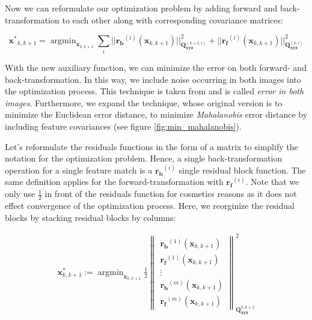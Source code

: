 \documentclass[a4paper]{report}
\numberwithin{figure}{section}
\newcommand{\argmin}{\mathop{\mathrm{argmin}}}
\begin{document}
Now we can reformulate our optimization problem by adding forward and
back-transformation to each other along with corresponding covariance matrices:

\begin{equation} \label{eq:residuals_w_back_and_forward} \mathbf{x^*}_{k,k+1} =
\argmin_{\mathbf{x}_{k,k+1}} \sum_i
||\mathbf{r_b}^{(i)}(\mathbf{x}_{k,k+1})||^2_{\mathbf{Q}^{(k+1,i)}_{\mathbf{xyz}}}+
||\mathbf{r_f}^{(i)}(\mathbf{x}_{k,k+1})
||^2_{\mathbf{Q}^{(k,i)}_{\mathbf{xyz}}} \end{equation}

With the new auxiliary function, we can minimize the error on both forward- and
back-transformation.  In this way, we include noise occurring in both images
into the optimization process. This technique is taken from
\parencite[see][101]{RichardHartley2003} and is called \textit{error in both 
images}.
Furthermore, we expand the technique, whose original version is to minimize the
Euclidean error distance, to minimize \textit{Mahalanobis} error distance by
including feature covariances (see figure \ref{fig:min_mahalanobis}).

Let's reformulate the residuals functions in the form of a matrix to simplify
the notation for the optimization problem.  Hence, a single back-transformation
operation for a single feature match is a $\mathbf{r_b}^{(i)}$ single residual
block function.  The same definition applies for the forward-transformation
with $\mathbf{r_f}^{(i)}$.  Note that we only use $\frac{1}{2}$ in front of the
residuals function for cosmetics reasons as it does not effect convergence of
the optimization process.  Here, we reorginize the residual blocks by stacking
residual blocks by columns:

\begin{equation} \label{eq:residuals_w_back_and_forward_matrix}
  \begin{aligned} \mathbf{x}^*_{k,k+1} :=
\argmin_{\mathbf{x}_{k,k+1}} \frac{1}{2} \begin{Vmatrix}
\mathbf{r_b}^{(1)}(\mathbf{x}_{k,k+1}) \\
\mathbf{r_f}^{(1)}(\mathbf{x}_{k,k+1}) \\ \vdots \\
\mathbf{r_b}^{(m)}(\mathbf{x}_{k,k+1}) \\
\mathbf{r_f}^{(m)}(\mathbf{x}_{k,k+1})
\end{Vmatrix}^2_{\mathbf{Q}^{k,k+1}_{\mathbf{xyz}}}
\end{aligned} \end{equation}
\end{document}
